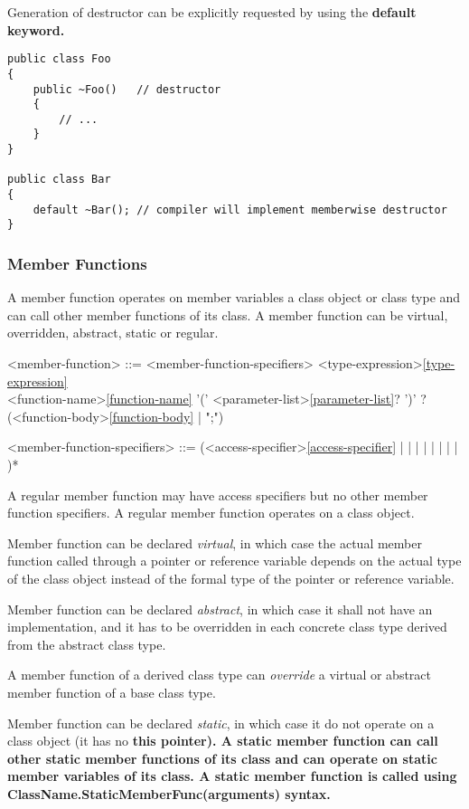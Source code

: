 \documentclass[a4paper,oneside,11pt]{article}
\begin{document}
Generation of destructor can be explicitly requested by using the \bf{default} keyword.

\begin{lstlisting}[frame=trBL]
public class Foo
{
    public ~Foo()   // destructor
    {
        // ...
    }
}

public class Bar
{
    default ~Bar(); // compiler will implement memberwise destructor
}
\end{lstlisting}

\subsubsection{Member Functions}

A member function operates on member variables a class object or class type and can call
other member functions of its class.
A member function can be virtual, overridden, abstract, static or regular.

\begin{grammar}
\label{member-function}<member-function> ::= <member-function-specifiers> <type-expression>\ref{type-expression}\\
<function-name>\ref{function-name} '(' <parameter-list>\ref{parameter-list}? ')' ?
(<function-body>\ref{function-body} | ";")

<member-function-specifiers> ::= (<access-specifier>\ref{access-specifier}
\alt {} |  |  |  |  |  |  |  | )*
\end{grammar}

A regular member function may have access specifiers but no other member function specifiers.
A regular member function operates on a class object.

Member function can be declared \emph{virtual}, in which case the actual member function called
through a pointer or reference variable depends on the actual type of the class object
instead of the formal type of the pointer or reference variable.

Member function can be declared \emph{abstract}, in which case it shall not have an implementation,
and it has to be overridden in each concrete class type derived from the abstract class type.

A member function of a derived class type can \emph{override} a virtual or abstract member function
of a base class type.

Member function can be declared \emph{static}, in which case it do not operate on a class object
(it has no \bf{this} pointer).
A static member function can call other static member functions of its class and can operate on
static member variables of its class.
A static member function is called using ClassName.StaticMemberFunc(arguments) syntax.
\end{document}
